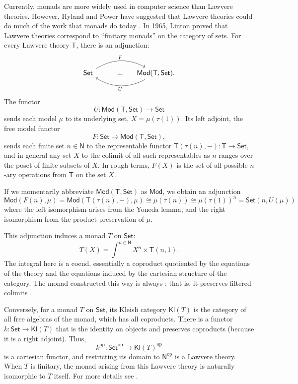 \documentclass{amsart}
\newcommand{\define}[1]{{\bf \boldmath{#1}}}
\theoremstyle{definition}
\def\ld{\rotatebox[origin=c]{-90}{$\dashv$}} %
\newcommand{\Set}{\mathsf{Set}}
\newcommand{\Mod}{\mathsf{Mod}}
\newcommand{\NN}{\mathsf{N}}
\newcommand{\T}{\mathsf{T}}
\newcommand{\Kl}{\mathsf{Kl}}
\newcommand{\op}{\mathrm{op}}
\newcommand{\maps}{\colon}
\begin{document}
Currently, monads are more widely used in computer science than Lawvere theories.  However, Hyland and Power have suggested that Lawvere theories could do much of the work that monads do today \cite{hylandpower}. In 1965, Linton \cite{linton} proved that Lawvere theories correspond to ``finitary monads'' on the category of sets.   For every Lawvere theory $\T$, there is an adjunction:
\[\begin{tikzcd}[column sep=small]
\Set \arrow[bend left,below]{rr}{F}
& {\phantom{AA} \ld} &
\arrow[bend left,above]{ll}{U} \Mod(\T,\Set).
\end{tikzcd}\]
The functor 
\[  U \maps \Mod(\T,\Set) \to \Set \]
sends each model $\mu$ to its underlying set, $X = \mu(\tau(1))$. 
Its left adjoint, the free model functor 
\[       F \maps\Set \to \Mod(\T,\Set), \]
sends each finite set $n \in \NN$ to the representable functor $\T(\tau(n),-)\maps \T \to \Set$, and in general any set $X$ to the colimit of all such representables as $n$ ranges over the poset of finite subsets of $X$.   In rough terms, $F(X)$ is the set of all possible $n$-ary operations from $\T$ on the set $X$.

If we momentarily abbreviate $\Mod(\T,\Set)$ as $\Mod$, we obtain an adjunction
\[   \Mod(F(n),\mu) = \Mod(\T(\tau(n),-),\mu) \cong \mu(\tau(n)) \cong \mu(\tau(1))^n = \Set(n,U(\mu))\] 
where the left isomorphism arises from the Yoneda lemma, and the right isomorphism from the product preservation of $\mu$.   

This adjunction induces a monad $T$ on $\Set$:
\begin{equation}
T(X) = \int^{n\in \NN} X^n \times \T(n,1).
\end{equation}
The integral here is a coend, essentially a coproduct quotiented by the equations of the theory and the equations induced by the cartesian structure of the category.    The monad constructed this way is always \define{finitary}: that is, it preserves filtered colimits \cite{adamekrosicky}.

Conversely, for a monad $T$ on $\Set$, its Kleisli category $\Kl(T)$ is the category of all free algebras of the monad, which has all coproducts. There is a functor $k\maps \Set \to \Kl(T)$ that is the identity on objects and preserves coproducts (because it is a right adjoint).  Thus,
\[ k^{\op}\maps \Set^{\op} \to \Kl(T)^{\op} \]
is a cartesian functor, and restricting its domain to $\NN^{\op}$ is a Lawvere theory. 
When $T$ is finitary, the monad arising from this Lawvere theory is naturally isomorphic to $T$ itself.  For more details see \cite{barrwells,lawvere,milewski}.
\end{document}

